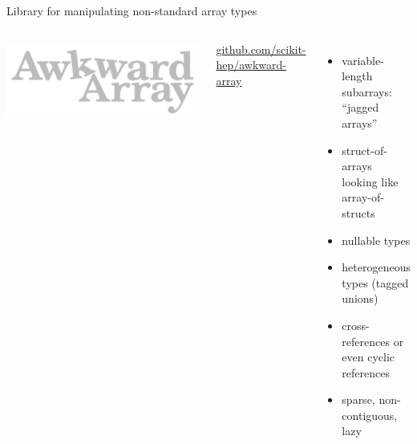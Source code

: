 \documentclass[aspectratio=169]{beamer}
\begin{document}
\begin{frame}{Library for manipulating non-standard array types}
\vspace{0.5 cm}
\begin{columns}
\includegraphics[width=\linewidth]{awkward-logo.pdf}

\vspace{0.25 cm}
\hfill \scriptsize \textcolor{darkblue}{\url{github.com/scikit-hep/awkward-array}}

\vspace{0.5 cm}
\vspace{2\baselineskip}
\begin{itemize}
\item variable-length subarrays: ``jagged arrays''
\item struct-of-arrays looking like array-of-structs
\item nullable types
\item heterogeneous types (tagged unions)
\item cross-references or even cyclic references
\item sparse, non-contiguous, lazy
\end{itemize}

\vspace{0.5 cm}
\end{columns}
\end{frame}
\end{document}

